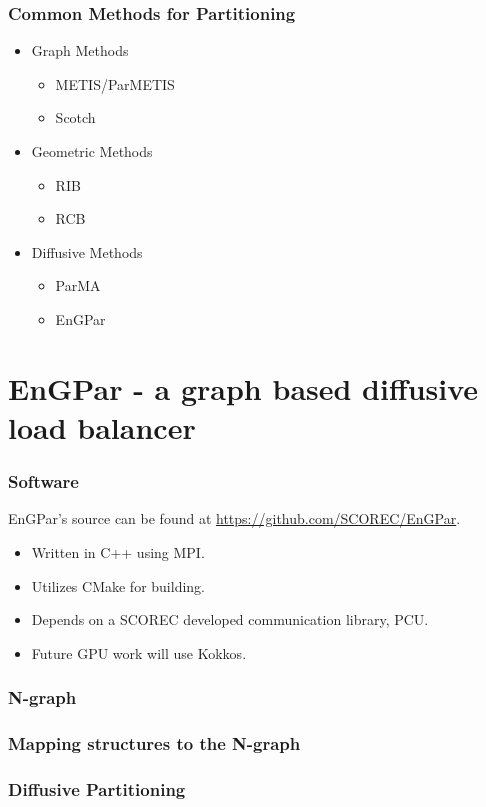 \documentclass{beamer}
\begin{document}
\begin{frame}
  \frametitle{Common Methods for Partitioning}
  \begin{itemize}
  \item Graph Methods %
    \begin{itemize}
    \item METIS/ParMETIS
    \item Scotch
    \end{itemize}
  \item Geometric Methods %
    \begin{itemize}
    \item RIB
    \item RCB
    \end{itemize}
  \item Diffusive Methods %
    \begin{itemize}
    \item ParMA
    \item EnGPar
    \end{itemize}
  \end{itemize}
\end{frame}

\section{EnGPar - a graph based diffusive load balancer}
\begin{frame}
  \frametitle{Software}
  EnGPar's source can be found at \url{https://github.com/SCOREC/EnGPar}.
  \begin{itemize}
  \item Written in C++ using MPI.
  \item Utilizes CMake for building.
  \item Depends on a SCOREC developed communication library, PCU.
  \item Future GPU work will use Kokkos.
  \end{itemize}
\end{frame}

\begin{frame}
  \frametitle{N-graph}
  
\end{frame}

\begin{frame}
  \frametitle{Mapping structures to the N-graph}
\end{frame}

\begin{frame}
  \frametitle{Diffusive Partitioning}
\end{frame}
\end{document}
